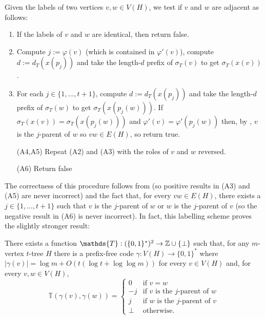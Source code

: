 \documentclass[kpfonts]{patmorin}
\begin{document}
Given the labels of two vertices $v,w\in V(H)$, we test if $v$ and $w$ are adjacent as follows:
\begin{enumerate}[({A}1)]
  \item If the labels of $v$ and $w$ are identical, then return false.
  
  \item Compute $j:=\varphi(v)$ (which is contained in $\varphi'(v)$), compute $d:=d_T(x(p_j))$ and take the length-$d$ prefix of $\sigma_T(v)$ to get $\sigma_T(x(v))$.

  \item For each $j\in\{1,\ldots,t+1\}$, compute $d:=d_T(x(p_j))$ and take the length-$d$ prefix of $\sigma_T(w)$ to get $\sigma_T(x(p_j(w)))$.  If $\sigma_T(x(v))=\sigma_T(x(p_j(w)))$ and $\varphi'(v)=\varphi'(p_j(w))$ then, by , $v$ is the $j$-parent of $w$ so $vw\in E(H)$, so return true.
  
  \item[(A4,A5)] Repeat (A2) and (A3) with the roles of $v$ and $w$ reversed.
  
  \item[(A6)] Return false
\end{enumerate}

The correctness of this procedure follows from  (so positive results in (A3) and (A5) are never incorrect) and the fact that, for every $vw\in E(H)$, there exists a $j\in\{1,\ldots,t+1\}$ such that $v$ is the $j$-parent of $w$ or $w$ is the $j$-parent of $v$ (so the negative result in (A6) is never incorrect).  In fact, this labelling scheme proves the slightly stronger result:

\begin{lem}
  There exists a function $\mathds{T}:(\{0,1\}^*)^2\to \Z\cup\{\perp\}$ such that, for any $m$-vertex $t$-tree $H$ there is a prefix-free code $\gamma:V(H)\to\{0,1\}^*$ where $|\gamma(v)|=\log m + O(t(\log t + \log\log m))$ for every $v\in V(H)$ and, for every $v,w\in V(H)$, 
  \[
      \mathds{T}(\gamma(v),\gamma(w)) = \begin{cases}
      0 & \text{if $v=w$} \\
      -j & \text{if $v$ is the $j$-parent of $w$} \\
      j & \text{if $w$ is the $j$-parent of $v$} \\
      \perp & \text{otherwise.}
    \end{cases}
  \]
\end{lem}
\end{document}
